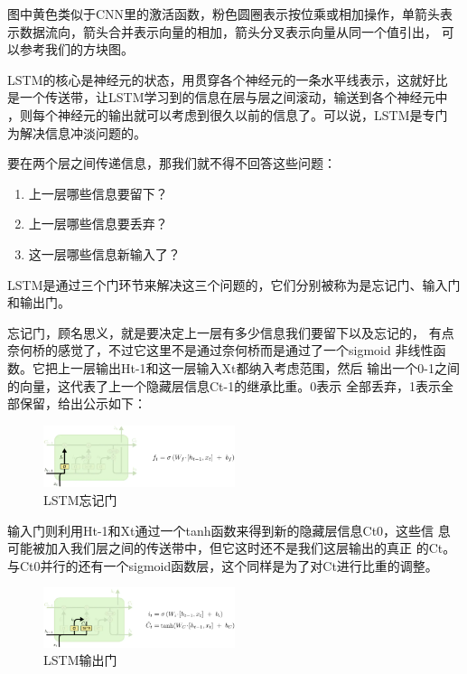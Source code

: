 \documentclass[11pt,a4paper]{elegantpaper}
\begin{document}
\begin{multicols}{2}
图中黄色类似于CNN里的激活函数，粉色圆圈表示按位乘或相加操作，单箭头表
示数据流向，箭头合并表示向量的相加，箭头分叉表示向量从同一个值引出，
可以参考我们的方块图。

LSTM的核心是神经元的状态，用贯穿各个神经元的一条水平线表示，这就好比
是一个传送带，让LSTM学习到的信息在层与层之间滚动，输送到各个神经元中
，则每个神经元的输出就可以考虑到很久以前的信息了。可以说，LSTM是专门
为解决信息冲淡问题的。


要在两个层之间传递信息，那我们就不得不回答这些问题：

\begin{enumerate}
  \item 上一层哪些信息要留下？
  \item 上一层哪些信息要丢弃？
  \item 这一层哪些信息新输入了？
\end{enumerate}

LSTM是通过三个门环节来解决这三个问题的，它们分别被称为是忘记门、输入门和输出门。

忘记门，顾名思义，就是要决定上一层有多少信息我们要留下以及忘记的，
有点奈何桥的感觉了，不过它这里不是通过奈何桥而是通过了一个sigmoid
非线性函数。它把上一层输出Ht-1和这一层输入Xt都纳入考虑范围，然后
输出一个0-1之间的向量，这代表了上一个隐藏层信息Ct-1的继承比重。0表示
全部丢弃，1表示全部保留，给出公示如下：

\begin{figure}[H]
  \centering
  \includegraphics[width=0.5\textwidth]{images/FJ.png}
  \caption{LSTM忘记门} 
\end{figure}

输入门则利用Ht-1和Xt通过一个tanh函数来得到新的隐藏层信息Ct0，这些信
息可能被加入我们层之间的传送带中，但它这时还不是我们这层输出的真正
的Ct。与Ct0并行的还有一个sigmoid函数层，这个同样是为了对Ct进行比重的调整。

\begin{figure}[H]
  \centering
  \includegraphics[width=0.5\textwidth]{images/SC.png}
  \caption{LSTM输出门} 
\end{figure}


\end{multicols}
\end{document}
